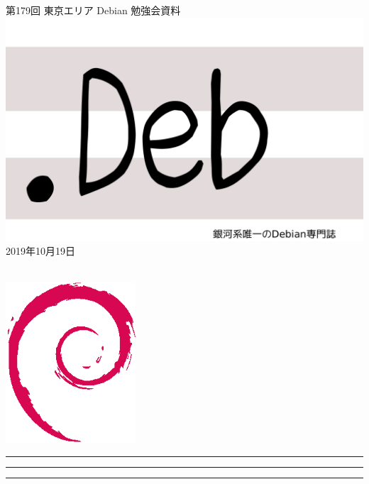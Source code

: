 \documentclass[mingoth,a4paper]{jsarticle}
\newcommand{\debmtgyear}{2019}
\newcommand{\debmtgmonth}{10}
\newcommand{\debmtgdate}{19}
\newcommand{\debmtgnumber}{179}
\begin{document}
\begin{titlepage}
\thispagestyle{empty}

\vspace*{-2cm}
第\debmtgnumber{}回 東京エリア Debian 勉強会資料\\
\hspace*{-2cm}
\includegraphics{image2012-natsu/dotdeb.pdf}\\
\hfill{}\debmtgyear{}年\debmtgmonth{}月\debmtgdate{}日

\\

\vspace*{-2cm}
\hfill{}\includegraphics[height=6cm]{image200502/openlogo-nd.eps}
\end{titlepage}

\newpage

\begin{minipage}[b]{0.2\hsize}
 \colorbox{titleback}{}
\end{minipage}
\begin{minipage}[b]{0.8\hsize}
\hrule
\vspace{2mm}
\hrule
\begin{multicols}{2}
\tableofcontents
\end{multicols}
\vspace{2mm}
\hrule
\end{minipage}
\end{document}
